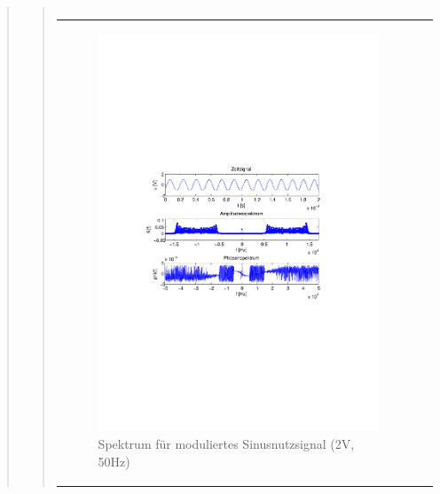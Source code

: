\begin{quote}
\begin{quote}
\begin{center}
\begin{tabular}{ll}
            \end{tabular}
            \end{center}
        
        
               \begin{center}
            \begin{tabular}{ll}

            \hspace{-14em}
                \begin{minipage}{0.6\textwidth}

                    \begin{figure}[H]
                        \label{fig:}
                        \includegraphics[scale=0.5, trim = 2cm 6.5cm 1.5cm
                        8.5cm, clip]{./Bilder/sin_a2_f50}
                        \caption{Spektrum für moduliertes Sinusnutzsignal (2V,
                        50Hz)}
                    \end{figure}


\end{minipage}
\end{tabular}
\end{center}
\end{quote}
\end{quote}
